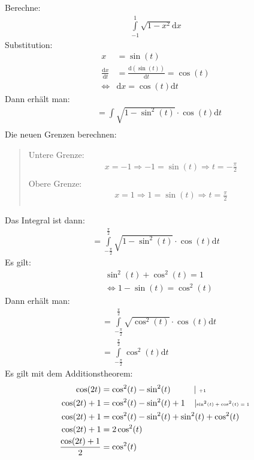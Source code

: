 Berechne:\\
\begin{align*}
\int\limits_{-1}^{1} \sqrt{1-x^2}\mathrm{d}x
\end{align*}
Substitution:\\
\begin{align*}
x&=\sin(t)\\
\frac{\mathrm{d}x}{\mathrm{d}t}&=\frac{\mathrm{d}(\sin(t))}{\mathrm{d}t}=\cos(t)\\
\Leftrightarrow&\mathrm{d}x=\cos(t)\mathrm{d}t
\end{align*}
Dann erhält man:\\
\begin{align*}
&=\int\limits_{}^{} \sqrt{1-\sin^2(t)}\cdot \cos(t)\mathrm{d}t\\
\end{align*}
Die neuen Grenzen berechnen:\\
\begin{quote}
	Untere Grenze:\\
	\begin{align*}
	&x=-1\Rightarrow -1=\sin(t)\Rightarrow t=-\frac{\pi}{2}\\
	\end{align*}
	Obere Grenze:\\
	\begin{align*}
	&x=1\Rightarrow 1=\sin(t)\Rightarrow t=\frac{\pi}{2}\\
	\end{align*}
\end{quote}
Das Integral ist dann:\\
\begin{align*}
=\int\limits_{-\frac{\pi}{2}}^{\frac{\pi}{2}} \sqrt{1-\sin^2(t)}\cdot \cos(t)\mathrm{d}t
\end{align*}
Es gilt:\\
\begin{align*}
&\sin^2(t)+\cos^2 (t)=1\\
&\Leftrightarrow1-\sin(t)=\cos^2(t)
\end{align*}
Dann erhält man:\\
\begin{align*}
&=\int\limits_{-\frac{\pi}{2}}^{\frac{\pi}{2}}\sqrt{\cos^2(t)}\cdot \cos(t)\mathrm{d}t\\
&=\int\limits_{-\frac{\pi}{2}}^{\frac{\pi}{2}} \cos^2(t)\mathrm{d}t
\end{align*}
Es gilt mit dem Additionstheorem:\\
\begin{align*}
\cos (2t)&=\cos^2(t)-\sin^2(t)\;\;\;\;\;\;\;\;\;\;\lvert \text{ \tiny +1}\\
\cos (2t)+1&=\cos^2(t)-\sin^2(t)+1\;\;\;\;\lvert \text{\tiny$ \sin^2(t)+\cos^2 (t)=1 $ }\\
\cos (2t)+1&=\cos^2(t)-\sin^2(t)+\sin^2(t)+\cos^2 (t)\\
\cos (2t)+1&=2\cos^2(t)\\
\frac{\cos(2t)+1}{2}&=\cos^2(t)
\end{align*}
